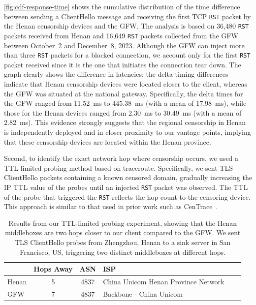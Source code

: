\documentclass[conference,compsoc]{IEEEtran}
\begin{document}
\autoref{fig:cdf-response-time} shows the cumulative distribution of
the time difference between sending a ClientHello message and receiving the first TCP \texttt{RST} packet
by the Henan censorship devices and the GFW.
The analysis is based on 36,480 \texttt{RST} packets received from Henan and 16,649 \texttt{RST} packets
collected from the GFW between October~2 and December~8, 2023.
Although the GFW can inject more than three \texttt{RST} packets for a blocked connection,
we account only for the first \texttt{RST} packet received since it is the one that initiates
the connection tear down. The graph clearly shows the difference in latencies: the delta
timing differences indicate that Henan censorship devices were located closer to the client,
whereas the GFW was situated at the national gateway. Specifically,
the delta times for the GFW ranged from 11.52~ms to 445.38~ms (with a mean of 17.98~ms),
while those for the Henan devices ranged from 2.30~ms to 30.49~ms (with a mean of 2.82~ms).
This evidence strongly suggests that the regional censorship in Henan is independently
deployed and in closer proximity to our vantage points, implying that these censorship
devices are located within the Henan province.


Second, to identify the exact network hop where censorship occurs,
we used a TTL-limited probing method based on traceroute.
Specifically, we sent TLS ClientHello packets containing a known censored domain,
gradually increasing the IP TTL value of the probes until an injected \texttt{RST} packet was observed.
The TTL of the probe that triggered the \texttt{RST} reflects the hop count to the censoring device.
This approach is similar to that used in prior work such as CenTrace~\cite{Raman2022a}.

\begin{table}[h]
  \centering
  \small
  \caption{
    Results from our TTL-limited probing experiment, showing that the Henan middleboxes are
    two hops closer to our client compared to the GFW.
    We sent TLS ClientHello probes from Zhengzhou, Henan to a sink server in San Francisco, US,
    triggering two distinct middleboxes at different hops.
    }
  \begin{tabular}{@{}lcc>{\raggedright\arraybackslash}p{4cm}cc@{}}

  \toprule
            & Hops Away   & ASN & ISP    \\
  \midrule
  Henan & 5   & 4837 & China Unicom  Henan Province Network  \\
  \midrule
  GFW  & 7     &    4837  & Backbone - China Unicom \\

  \bottomrule
  \end{tabular}
  \label{table:centrace-results}
\end{table}
\end{document}
